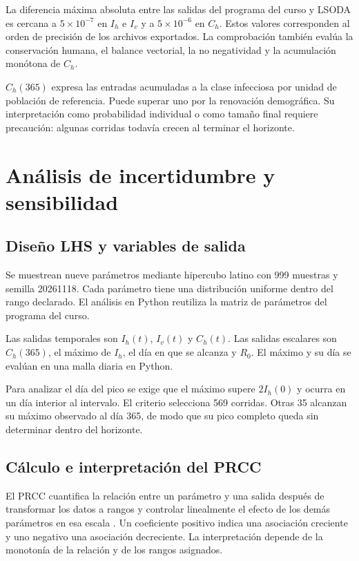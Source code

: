 \documentclass[12pt,spanish,oneside,openany]{MastersDoctoralThesis}
\numberwithin{equation}{section}
\begin{document}
La diferencia máxima absoluta entre las salidas del programa del curso y LSODA es cercana a $5\times10^{-7}$ en $I_h$ e $I_v$ y a $5\times10^{-6}$ en $C_h$. Estos valores corresponden al orden de precisión de los archivos exportados. La comprobación también evalúa la conservación humana, el balance vectorial, la no negatividad y la acumulación monótona de $C_h$.

$C_h(365)$ expresa las entradas acumuladas a la clase infecciosa por unidad de población de referencia. Puede superar uno por la renovación demográfica. Su interpretación como probabilidad individual o como tamaño final requiere precaución: algunas corridas todavía crecen al terminar el horizonte.

\section{Análisis de incertidumbre y sensibilidad}
\subsection{Diseño LHS y variables de salida}
Se muestrean nueve parámetros mediante hipercubo latino con 999 muestras y semilla 20261118. Cada parámetro tiene una distribución uniforme dentro del rango declarado. El análisis en Python reutiliza la matriz de parámetros del programa del curso.

Las salidas temporales son $I_h(t)$, $I_v(t)$ y $C_h(t)$. Las salidas escalares son $C_h(365)$, el máximo de $I_h$, el día en que se alcanza y $R_0$. El máximo y su día se evalúan en una malla diaria en Python.

Para analizar el día del pico se exige que el máximo supere $2I_h(0)$ y ocurra en un día interior al intervalo. El criterio selecciona 569 corridas. Otras 35 alcanzan su máximo observado al día 365, de modo que su pico completo queda sin determinar dentro del horizonte.

\subsection{Cálculo e interpretación del PRCC}
El PRCC cuantifica la relación entre un parámetro y una salida después de transformar los datos a rangos y controlar linealmente el efecto de los demás parámetros en esa escala \cite{marino}. Un coeficiente positivo indica una asociación creciente y uno negativo una asociación decreciente. La interpretación depende de la monotonía de la relación y de los rangos asignados.
\end{document}
